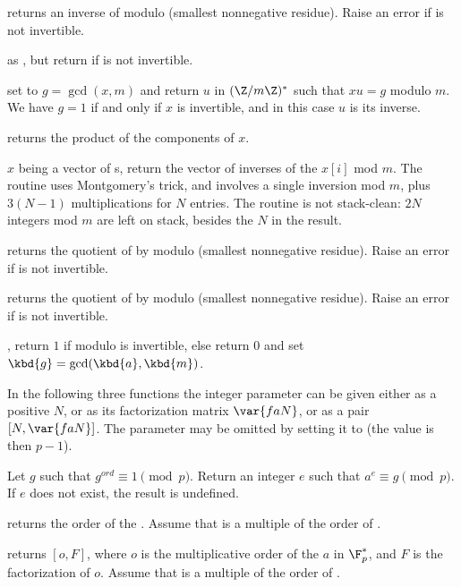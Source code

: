  returns an inverse of  modulo 
(smallest nonnegative residue). Raise an error if  is not invertible.

 as , but return
 if  is not invertible.

 set  to
$g = \gcd(x,m)$ and return $u$ in $(\Z/m\Z)^*$ such that $x u = g$ modulo $m$.
We have $g = 1$ if and only if $x$ is invertible, and in this case $u$
is its inverse.

 returns the product of the components of
$x$.

 $x$ being a vector of s, return
the vector of inverses of the $x[i]$ mod $m$. The routine uses Montgomery's
trick, and involves a single inversion mod $m$, plus $3(N-1)$ multiplications
for $N$ entries. The routine is not stack-clean: $2N$ integers mod $m$
are left on stack, besides the $N$ in the result.

 returns the quotient of  by
 modulo  (smallest nonnegative residue). Raise an error if
 is not invertible.

 returns the quotient of  by
 modulo  (smallest nonnegative residue). Raise an error if
 is not invertible.

,  return $1$ if 
modulo  is invertible, else return $0$ and set
$\kbd{g} = \gcd(\kbd{a},\kbd{m})$.

In the following three functions the integer parameter  can be given
either as a positive  $N$, or as its factorization matrix $\var{faN}$,
 or as a pair $[N,\var{faN}]$. The parameter may be omitted by setting it to
 (the value is then $p-1$).

 Let $g$ such that
$g^{ord} \equiv 1 \pmod{p}$. Return an integer $e$ such that
$a^e \equiv g \pmod{p}$. If $e$ does not exist, the result is undefined.

 returns the order of the
 . Assume that  is a multiple of the order of
.

 returns $[o,F]$, where $o$
is the multiplicative order of the  $a$ in $\F_p^*$, and $F$ is the
factorization of $o$. Assume that  is a multiple of the order of
.


